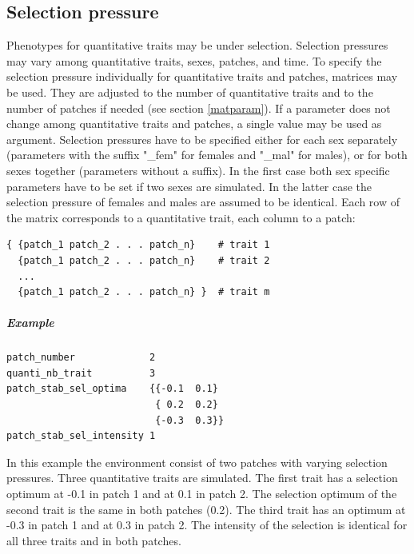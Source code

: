 \documentclass[letterpaper,12pt,oneside]{book}
\begin{document}
\begin{appendices}
\chapter{Selection pressure}\label{selPressure}
Phenotypes for quantitative traits  may be under selection. Selection pressures may vary among quantitative traits, sexes, patches, and time. To specify the selection pressure individually for quantitative traits and patches, matrices may be used. They are adjusted to the number of quantitative traits and to the number of patches if needed (see section \ref{matparam}). If a parameter does not change among quantitative traits and patches, a single value may be used as argument. Selection pressures have to be specified either for each sex separately (parameters with the suffix "\_fem" for females and "\_mal" for males), or for both sexes together (parameters without a suffix). In the first case both sex specific parameters have to be set if two sexes are simulated. In the latter case the selection pressure of females and males are assumed to be identical. Each row of the matrix corresponds to a quantitative trait, each column to a patch:
\begin{lstlisting}[frame=single]
{ {patch_1 patch_2 . . . patch_n}    # trait 1
  {patch_1 patch_2 . . . patch_n}    # trait 2
  ...
  {patch_1 patch_2 . . . patch_n} }  # trait m
\end{lstlisting}

\paragraph{Example}\hspace*{\fill}
\begin{lstlisting}[frame=single]
patch_number             2
quanti_nb_trait          3
patch_stab_sel_optima    {{-0.1  0.1}							
                          { 0.2  0.2}
                          {-0.3  0.3}}	
patch_stab_sel_intensity 1													
\end{lstlisting}
In this example the environment consist of two patches with varying selection pressures. Three quantitative traits are simulated. The first trait has a selection optimum at -0.1 in patch 1 and at 0.1 in patch 2. The selection optimum of the second trait is the same in both patches (0.2). The third trait has an optimum at -0.3 in patch 1 and at 0.3 in patch 2. The intensity of the selection is identical for all three traits and in both patches.    



\end{appendices}
\end{document}
